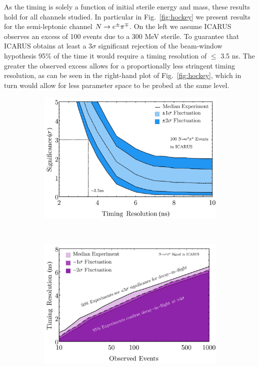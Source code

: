 \documentclass[11pt, a4paper]{article}
\newcommand{\reffig}[1]{Fig.~\ref{#1}}
\def\ster{\ensuremath N}
\begin{document}
As the timing is solely a function of initial sterile energy and
mass, these results hold for all channels studied. In particular in \reffig{fig:hockey} we present results for the semi-leptonic channel $\ster \rightarrow e^\pm \pi^\mp$.  On the left we assume ICARUS observes an excess of 100 events due to a 300 MeV sterile. To guarantee that ICARUS obtains at least a $3\sigma$
significant rejection of the beam-window hypothesis 95\% of the time it would require a timing resolution of $\leq$ 3.5 ns. The greater the observed
excess allows for a proportionally less stringent timing resolution, as can be seen in the right-hand plot of \reffig{fig:hockey}, which in turn would allow for less parameter space to be probed at the same level.

\begin{figure}[t]
\center
\begin{subfigure}[t]{0.5\textwidth}
\includegraphics[width=\textwidth]{figures/hockey_plot.pdf}
\end{subfigure}%
~
\begin{subfigure}[t]{0.5\textwidth}
\includegraphics[width=\textwidth]{figures/icarus_contour.pdf}

\end{subfigure}
\end{figure}
\end{document}
